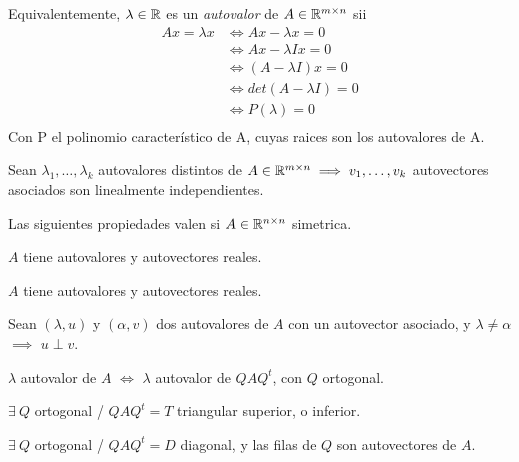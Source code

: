 \begin{coro}
	Equivalentemente, $\lambda \in \mathbb{R}$ es un \textit{autovalor} de $A\in\mathbb{R}^{m\times n}$ sii
	\begin{equation*}
		\begin{aligned}
			Ax = \lambda x &\iff Ax - \lambda x = 0		\\
			 			   &\iff Ax - \lambda I x = 0	\\
						   &\iff (A - \lambda I)x = 0	\\
						   &\iff det(A - \lambda I) = 0	\\
						   &\iff P(\lambda) = 0	\\
		\end{aligned}
	\end{equation*}
	Con P el polinomio característico de A, cuyas raices son los autovalores de A.
\end{coro}

\begin{propi}
	Sean $\lambda_1, \dots, \lambda_k$ autovalores distintos de $A \in\mathbb{R}^{m\times n} \implies v_1, \dots, v_k$
	autovectores asociados son linealmente independientes.
\end{propi}

Las siguientes propiedades valen si $A \in\mathbb{R}^{n\times n}$ simetrica.

\begin{propi}
	$A$ tiene autovalores y autovectores reales.
\end{propi}

\begin{propi}
	$A$ tiene autovalores y autovectores reales.
\end{propi}

\begin{propi}
	Sean $(\lambda, u)$ y $(\alpha, v)$ dos autovalores de $A$
	con un autovector asociado, y $\lambda \neq \alpha$ $\implies$ $u \perp v$.
\end{propi}

\begin{propi}
	$\lambda$ autovalor de $A$ $\iff$ $\lambda$ autovalor de $QAQ^{t}$, con $Q$ ortogonal.
\end{propi}

\begin{propi}
	$\exists\ Q$ ortogonal / $QAQ^{t} = T$ triangular superior, o inferior.
\end{propi}

\begin{propi}
	$\exists\ Q$ ortogonal / $QAQ^{t} = D$ diagonal, y las filas de $Q$ son autovectores
	de $A$.
\end{propi}

